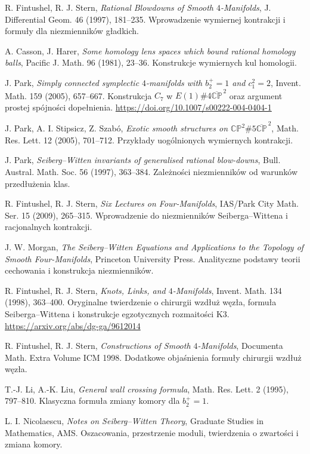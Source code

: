 \begin{enumerate}[label={[\arabic*]},leftmargin=*,itemsep=3pt]
\item R. Fintushel, R. J. Stern, \emph{Rational Blowdowns of Smooth
$4$-Manifolds}, J. Differential Geom. 46 (1997), 181--235.
Wprowadzenie wymiernej kontrakcji i formuły dla niezmienników gładkich.
\item A. Casson, J. Harer, \emph{Some homology lens spaces which bound
rational homology balls}, Pacific J. Math. 96 (1981), 23--36.
Konstrukcje wymiernych kul homologii.
\item J. Park, \emph{Simply connected symplectic $4$-manifolds with $b_2^+=1$ and $c_1^2=2$}, Invent. Math. 159 (2005), 657--667. Konstrukcja $C_7$ w $E(1)\#4\overline{\mathbb{CP}}^{\,2}$ oraz argument prostej spójności dopełnienia. \url{https://doi.org/10.1007/s00222-004-0404-1}
\item J. Park, A. I. Stipsicz, Z. Szabó, \emph{Exotic smooth structures
on $\mathbb{CP}^2\#5\overline{\mathbb{CP}}^{\,2}$},
Math. Res. Lett. 12 (2005), 701--712.
Przykłady uogólnionych wymiernych kontrakcji.
\item J. Park, \emph{Seiberg--Witten invariants of generalised rational
blow-downs}, Bull. Austral. Math. Soc. 56 (1997), 363--384.
Zależności niezmienników od warunków przedłużenia klas.
\item R. Fintushel, R. J. Stern, \emph{Six Lectures on Four-Manifolds},
IAS/Park City Math. Ser. 15 (2009), 265--315.
Wprowadzenie do niezmienników Seiberga--Wittena i racjonalnych kontrakcji.
\item J. W. Morgan, \emph{The Seiberg--Witten Equations and Applications
to the Topology of Smooth Four-Manifolds}, Princeton University Press.
Analityczne podstawy teorii cechowania i konstrukcja niezmienników.
\item R. Fintushel, R. J. Stern, \emph{Knots, Links, and
$4$-Manifolds}, Invent. Math. 134 (1998), 363--400.
Oryginalne twierdzenie o chirurgii wzdłuż węzła, formuła
Seiberga--Wittena i konstrukcje egzotycznych rozmaitości K3.
\url{https://arxiv.org/abs/dg-ga/9612014}
\item R. Fintushel, R. J. Stern, \emph{Constructions of Smooth
$4$-Manifolds}, Documenta Math. Extra Volume ICM 1998.
Dodatkowe objaśnienia formuły chirurgii wzdłuż węzła.
\item T.-J. Li, A.-K. Liu, \emph{General wall crossing formula},
Math. Res. Lett. 2 (1995), 797--810.
Klasyczna formuła zmiany komory dla $b_2^+=1$.
\item L. I. Nicolaescu, \emph{Notes on Seiberg--Witten Theory},
Graduate Studies in Mathematics, AMS. Oszacowania,
przestrzenie moduli, twierdzenia o zwartości i zmiana komory.
\end{enumerate}

